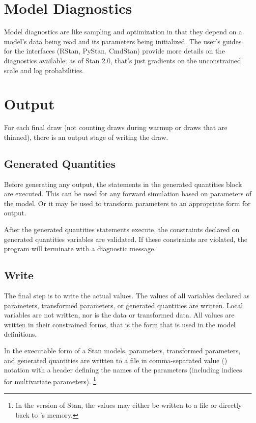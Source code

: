 \section{Model Diagnostics}

Model diagnostics are like sampling and optimization in that they
depend on a model's data being read and its parameters being
initialized.  The user's guides for the interfaces (RStan, PyStan,
CmdStan) provide more details on the diagnostics available; as of Stan
2.0, that's just gradients on the unconstrained scale and log
probabilities.

\section{Output}

For each final draw (not counting draws during warmup or draws
that are thinned), there is an output stage of writing the draw.

\subsection{Generated Quantities}

Before generating any output, the statements in the generated quantities
block are executed.  This can be used for any forward simulation based
on parameters of the model.  Or it may be used to transform parameters
to an appropriate form for output.

After the generated quantities statements execute, the constraints
declared on generated quantities variables are validated.   If these
constraints are violated, the program will terminate with a diagnostic message.

\subsection{Write}

The final step is to write the actual values.  The values of all
variables declared as parameters, transformed parameters, or generated
quantities are written.  Local variables are not written, nor is the
data or transformed data.  All values are written in their constrained
forms, that is the form that is used in the model definitions.

In the executable form of a Stan models, parameters, transformed
parameters, and generated quantities are written to a file in
comma-separated value () notation with a header defining
the names of the parameters (including indices for multivariate
parameters).%
\footnote{In the \R version of Stan, the values may either be
written to a  file or directly back to \R's memory.}


